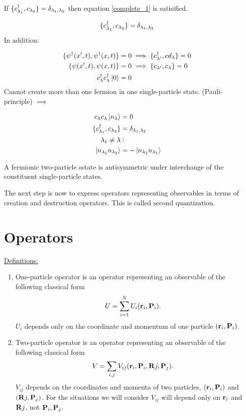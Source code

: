 If $\{c^{\dagger}_{\lambda_1}, c_{\lambda_2}\}= \delta_{\lambda_1, \lambda_2}$ then equation \eqref{complete_1} is satisified.

\begin{equation}
	\{c^{\dagger}_{\lambda_1}, c_{\lambda_2}\}= \delta_{\lambda_1, \lambda_2}
\end{equation}

\noindent $\underline{\text{In addition:}}$

\begin{align}
	\{ \psi^\dagger(x',t), \psi^\dagger(x,t) \} &= 0 \implies \{c^{\dagger}_{\lambda'}, cd_\lambda\} =0\\
	\{ \psi(x',t), \psi(x,t) \} &= 0 \implies \{c_{\lambda'}, c_\lambda\} =0\\
	c^{\dagger}_\lambda c^{\dagger}_\lambda \ket{0}&=0
\end{align}
Cannot create more than one fermion in one single-particle state. (Pauli-principle) $\implies$

\begin{align*}
	c_\lambda c_\lambda \ket{n_\lambda}&=0\\
	\{c^{\dagger}_{\lambda_1},c_{\lambda_2}\}&= \delta_{\lambda_1, \lambda_2}\\
	\lambda_1 \neq \lambda &:\\
	\ket{n_{\lambda_1} n_{\lambda_2}} &= - \ket{n_{\lambda_2} n_{\lambda_1}}
\end{align*}

\noindent A fermionic two-particle sstate is antisymmetric under interchange of the constituent single-particle states.

\begin{tcolorbox}
	The next step is now to express operators representing observables in terms of creation and destruction operators. This is called $\underline{\text{second quantization}}$.
\end{tcolorbox}

\section{Operators}

\noindent \uline{Definitions:}

\begin{enumerate}
	\item
		One-particle operator is an operator representing an observable of the following classical form
		\begin{equation}
			U= \sum_{i=1}^{N} U_i(\vb{r}_i, \vb{P}_i).
		\end{equation}
		$U_i$ depends only on the coordinate and momentum of one particle $(\vb{r}_i, \vb{P}_i)$.
	\item
		Two-particle operator is an operator representing an observable of the following classical form
		\begin{equation}
			V= \sum_{i,j } V_{ij} (\vb{r}_i, \vb{P}_i,\vb{R}j, \vb{P}_j).
		\end{equation}
		$V_{ij}$ depends on the coordinates and momenta of two particles, $(\vb{r}_i, \vb{P}_i)$ and $(\vb{R}j, \vb{P}_j)$. For the situations we will consider $V_{ij}$ will depend only on $\vb{r}_i$ and $\vb{R}j$, not $\vb{P}_i, \vb{P}_j$.
\end{enumerate}

